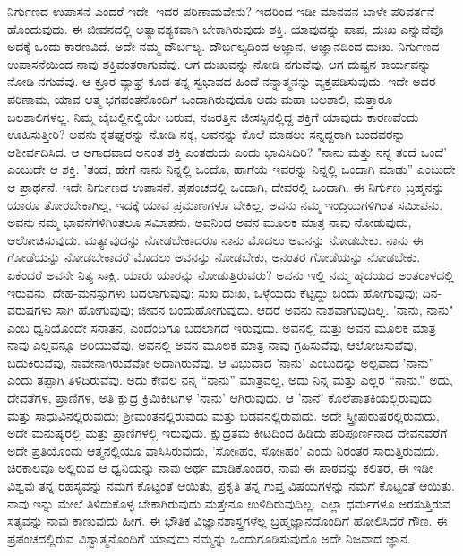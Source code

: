 ನಿರ್ಗುಣದ ಉಪಾಸನೆ ಎಂದರೆ ಇದೇ. ಇದರ ಪರಿಣಾಮವೇನು? ಇದರಿಂದ ಇಡೀ ಮಾನವನ ಬಾಳೇ ಪರಿವರ್ತನೆ ಹೊಂದುವುದು. ಈ ಜೀವನದಲ್ಲಿ ಅತ್ಯಾವಶ್ಯಕವಾಗಿ ಬೇಕಾಗಿರುವುದು ಶಕ್ತಿ. ಯಾವುದನ್ನು ಪಾಪ, ದುಃಖ ಎನ್ನುವೆವೊ ಅದಕ್ಕೆ ಒಂದು ಕಾರಣವಿದೆ. ಅದೇ ನಮ್ಮ ದೌರ್ಬಲ್ಯ. ದೌರ್ಬಲ್ಯದಿಂದ ಅಜ್ಞಾನ, ಅಜ್ಞಾನದಿಂದ ದುಃಖ. ನಿರ್ಗುಣದ ಉಪಾಸನೆಯಿಂದ ನಾವು ಶಕ್ತಿವಂತರಾಗುವೆವು. ಆಗ ದುಃಖವನ್ನು ನೋಡಿ ನಗುವೆವು. ಆಗ ದುಷ್ಟನ ಕಾರ್ಯವನ್ನು ನೋಡಿ ನಗುವೆವು. ಆ ಕ್ರೂರ ವ್ಯಾಘ್ರ ಕೂಡ ತನ್ನ ಸ್ವಭಾವದ ಹಿಂದೆ ನನ್ನಾತ್ಮನನ್ನು ವ್ಯಕ್ತಪಡಿಸುವುದು. ಇದೇ ಅದರ ಪರಿಣಾಮ, ಯಾವ ಆತ್ಮ ಭಗವಂತನೊಂದಿಗೆ ಒಂದಾಗಿರುವುದೊ ಅದು ಮಹಾ ಬಲಶಾಲಿ, ಮತ್ತಾರೂ ಬಲಶಾಲಿಗಳಲ್ಲ. ನಿಮ್ಮ ಬೈಬಲ್ಲಿನಲ್ಲಿಯೇ ಬರುವ, ನಜರತ್ತಿನ ಜೀಸಸ್ಸಿನಲ್ಲಿದ್ದ ಶಕ್ತಿಗೆ ಯಾವುದು ಕಾರಣವೆಂದು ಊಹಿಸುತ್ತೀರಿ? ಅವನು ಕೃತಘ್ನರನ್ನು ನೋಡಿ ನಕ್ಕ, ಅವನನ್ನು ಕೊಲೆ ಮಾಡಲು ಸನ್ನದ್ದರಾಗಿ ಬಂದವರನ್ನು ಆಶೀರ್ವದಿಸಿದ. ಆ ಅಗಾಧವಾದ ಅನಂತ ಶಕ್ತಿ ಎಂತಹುದು ಎಂದು ಭಾವಿಸಿದಿರಿ? "ನಾನು ಮತ್ತು ನನ್ನ ತಂದೆ ಒಂದೆ' ಎಂಬುದೇ ಆ ಶಕ್ತಿ. 'ತಂದೆ, ಹೇಗೆ ನಾನು ನಿನ್ನಲ್ಲಿ ಒಂದೊ, ಹಾಗೆಯೆ ಇವರನ್ನು ನಿನ್ನಲ್ಲಿ ಒಂದಾಗಿ ಮಾಡು'' ಎಂಬುದೇ ಆ ಪ್ರಾರ್ಥನೆ. ಇದೇ ನಿರ್ಗುಣದ ಉಪಾಸನೆ. ಪ್ರಪಂಚದಲ್ಲಿ ಒಂದಾಗಿ, ದೇವರಲ್ಲಿ ಒಂದಾಗಿ. ಈ ನಿರ್ಗುಣ ಬ್ರಹ್ಮನನ್ನು ಯಾರೂ ತೋರಬೇಕಾಗಿಲ್ಲ, ಇದಕ್ಕೆ ಯಾವ ಪ್ರಮಾಣಗಳೂ ಬೇಕಿಲ್ಲ. ಅವನು ನಮ್ಮ ಇಂದ್ರಿಯಗಳಿಗಿಂತ ಸಮೀಪನು. ಅವನು ನಮ್ಮ ಭಾವನೆಗಳಿಗಿಂತಲೂ ಸಮಿಾಪನು. ಅವನಿಂದ ಅವನ ಮೂಲಕ ಮಾತ್ರ ನಾವು ನೋಡುವುದು, ಆಲೋಚಿಸುವುದು. ಮತ್ಯಾವುದನ್ನು ನೋಡಬೇಕಾದರೂ ನಾನು ಮೊದಲು ಅವನನ್ನು ನೋಡಬೇಕು. ನಾನು ಈ ಗೋಡೆಯನ್ನು ನೋಡಬೇಕಾದರೆ ಮೊದಲು ಅವನನ್ನು ನೋಡಬೇಕು, ಅನಂತರ ಗೋಡೆಯನ್ನು ನೋಡಬೇಕು. ಏಕೆಂದರೆ ಅವನೇ ನಿತ್ಯ ಸಾಕ್ಷಿ. ಯಾರು ಯಾರನ್ನು ನೋಡುತ್ತಿರುವರು? ಅವನು ಇಲ್ಲಿ ನಮ್ಮ ಹೃದಯದ ಅಂತರಾಳದಲ್ಲಿ ಇರುವನು. ದೇಹ-ಮನಸ್ಸುಗಳು ಬದಲಾಗುವುವು; ಸುಖ ದುಃಖ, ಒಳ್ಳೆಯದು ಕೆಟ್ಟದ್ದು ಬಂದು ಹೋಗುವುವು; ದಿನ-ವರುಷಗಳು ಸಾಗಿ ಹೋಗುವುವು; ಜೀವನ ಬಂದುಹೋಗುವುದು. ಆದರೆ ಅವನು ನಾಶವಾಗುವುದಿಲ್ಲ. 'ನಾನು, ನಾನು" ಎಂಬ ಧ್ವನಿಯೊಂದೇ ಸನಾತನ, ಎಂದೆಂದಿಗೂ ಬದಲಾಗದೆ ಇರುವುದು. ಅವನಲ್ಲಿ ಮತ್ತು ಅವನ ಮೂಲಕ ಮಾತ್ರ ನಾವು ಎಲ್ಲವನ್ನೂ ಅರಿಯುವೆವು. ಅವನಲ್ಲಿ ಅವನ ಮೂಲಕ ಮಾತ್ರ ನಾವು ಗ್ರಹಿಸುವೆವು, ಆಲೋಚಿಸುವೆವು, ಬದುಕಿರುವೆವು, ನಾವೇನಾಗಿರುವೆವೋ ಅದಾಗಿರುವೆವು. ಆ ವಿಭುವಾದ 'ನಾನು' ಎಂಬುದನ್ನು ಅಲ್ಪವಾದ 'ನಾನು'' ಎಂದು ತಪ್ಪಾಗಿ ತಿಳಿದಿರುವೆವು. ಅದು ಕೇವಲ ನನ್ನ “ನಾನು” ಮಾತ್ರವಲ್ಲ, ಅದು ನಿನ್ನ ಮತ್ತು ಎಲ್ಲರ “ನಾನು.” ಅದು, ದೇವತೆಗಳ, ಪ್ರಾಣಿಗಳ, ಅತಿ ಕ್ಷುದ್ರ ಕ್ರಿಮಿಕೀಟಗಳ 'ನಾನು' ಆಗಿರುವುದು. ಆ 'ನಾನೆ' ಕೊಲೆಪಾತಕಿಯಲ್ಲಿರುವುದು ಮತ್ತು ಸಾಧುವಿನಲ್ಲಿರುವುದು; ಶ‍್ರೀಮಂತನಲ್ಲಿರುವುದು ಮತ್ತು ಬಡವನಲ್ಲಿರುವುದು. ಅದೇ ಸ್ತ್ರೀಪುರುಷರಲ್ಲಿರುವುದು, ಅದೇ ಮನುಷ್ಯರಲ್ಲಿ ಮತ್ತು ಪ್ರಾಣಿಗಳಲ್ಲಿ ಇರುವುದು. ಕ್ಷುದ್ರತಮ ಕೀಟದಿಂದ ಹಿಡಿದು ಪರಿಪೂರ್ಣನಾದ ದೇವನವರೆಗೆ ಅದೇ ಪ್ರತಿಯೊಂದು ಆತ್ಮನಲ್ಲಿಯೂ ವಾಸಿಸಿರುವುದು, 'ಸೋsಹಂ, ಸೋsಹಂ' ಎಂದು ನಿರಂತರ ಸಾರುತ್ತಿರುವುದು. ಚಿರಕಾಲವೂ ಅಲ್ಲಿರುವ ಆ ಧ್ವನಿಯನ್ನು ನಾವು ಅರ್ಥ ಮಾಡಿಕೊಂಡರೆ, ನಾವು ಈ ಪಾಠವನ್ನು ಕಲಿತರೆ, ಈ ಇಡೀ ವಿಶ್ವವು ತನ್ನ ರಹಸ್ಯವನ್ನು ನಮಗೆ ಕೊಟ್ಟಂತೆ ಆಯಿತು, ಪ್ರಕೃತಿ ತನ್ನ ಗುಪ್ತ ವಿಷಯಗಳನ್ನು ನಮಗೆ ಕೊಟ್ಟಂತೆ ಆಯಿತು. ನಾವು ಇನ್ನು ಮೇಲೆ ತಿಳಿದುಕೊಳ್ಳ ಬೇಕಾಗಿರುವುದು ಮತ್ತೇನೂ ಉಳಿದಿರುವುದಿಲ್ಲ. ಎಲ್ಲಾ ಧರ್ಮಗಳೂ ಅರಸುತ್ತಿರುವ ಸತ್ಯವನ್ನು ನಾವು ಕಾಣುವುದು ಹೀಗೆ. ಈ ಭೌತಿಕ ವಿಜ್ಞಾನಶಾಸ್ತ್ರಗಳೆಲ್ಲ ಬ್ರಹ್ಮಜ್ಞಾನದೊಂದಿಗೆ ಹೋಲಿಸಿದರೆ ಗೌಣ. ಈ ಪ್ರಪಂಚದಲ್ಲಿರುವ ವಿಶ್ವಾತ್ಮನೊಂದಿಗೆ ಯಾವುದು ನಮ್ಮನ್ನು ಒಂದುಗೂಡಿಸುವುದೊ ಅದೇ ನಿಜವಾದ ಜ್ಞಾನ.

